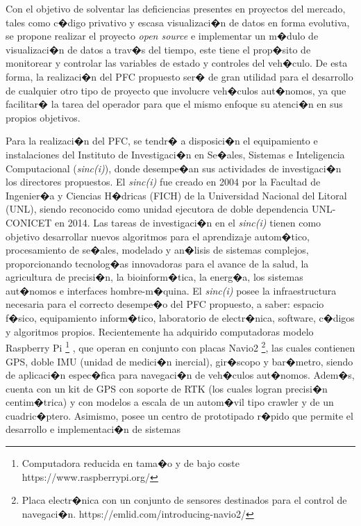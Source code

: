 

Con el objetivo de solventar las deficiencias presentes en proyectos del mercado, tales como c�digo privativo y escasa visualizaci�n de datos en forma evolutiva, se propone realizar el proyecto \textit{open source} e implementar un m�dulo de visualizaci�n de datos a trav�s del tiempo, este tiene el prop�sito de monitorear y controlar las variables de estado y
controles del veh�culo. De esta forma, la realizaci�n del PFC propuesto ser� de gran utilidad para el desarrollo
de cualquier otro tipo de proyecto que involucre veh�culos aut�nomos, ya que facilitar� la tarea del operador para que el mismo enfoque su atenci�n en sus propios objetivos.
\par Para la realizaci�n del PFC, se tendr� a disposici�n el equipamiento e instalaciones del Instituto de Investigaci�n en Se�ales, Sistemas e Inteligencia Computacional (\textit{sinc(i)}), donde desempe�an sus actividades de investigaci�n los directores propuestos. El \textit{sinc(i) }fue creado en 2004 por la Facultad de Ingenier�a y Ciencias H�dricas (FICH) de la Universidad Nacional del Litoral (UNL), siendo reconocido como unidad ejecutora de doble dependencia UNL-CONICET en 2014. Las tareas de investigaci�n en el \textit{sinc(i)} tienen como objetivo desarrollar nuevos algoritmos para el aprendizaje autom�tico, procesamiento de se�ales, modelado y an�lisis de sistemas complejos, proporcionando tecnolog�as innovadoras para el avance de la salud, la agricultura de precisi�n, la bioinform�tica, la energ�a, los sistemas aut�nomos e interfaces hombre-m�quina. El \textit{sinc(i)} posee la infraestructura necesaria para el correcto desempe�o del PFC propuesto, a saber: espacio f�sico, equipamiento inform�tico, laboratorio de electr�nica, software, c�digos y algoritmos propios. Recientemente ha adquirido computadoras modelo Raspberry Pi \footnote{Computadora reducida en tama�o y de bajo coste https://www.raspberrypi.org/ } , que operan en conjunto con placas Navio2 \footnote{Placa electr�nica con un conjunto de sensores destinados para el control de navegaci�n.
 https://emlid.com/introducing-navio2/}, las cuales contienen GPS, doble IMU (unidad de medici�n inercial), gir�scopo y bar�metro, siendo de aplicaci�n espec�fica para navegaci�n de veh�culos aut�nomos. Adem�s, cuenta con un kit de GPS con soporte de RTK (los cuales logran precisi�n centim�trica) y con modelos a escala de un autom�vil tipo crawler y de un cuadric�ptero. Asimismo, posee un centro de prototipado r�pido que permite el desarrollo e implementaci�n de sistemas
